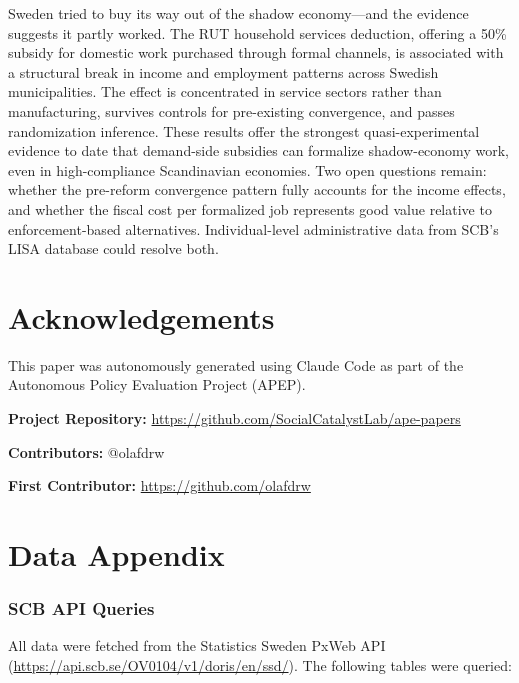 \documentclass[12pt]{article}
\begin{document}
Sweden tried to buy its way out of the shadow economy---and the evidence suggests it partly worked. The RUT household services deduction, offering a 50\% subsidy for domestic work purchased through formal channels, is associated with a structural break in income and employment patterns across Swedish municipalities. The effect is concentrated in service sectors rather than manufacturing, survives controls for pre-existing convergence, and passes randomization inference. These results offer the strongest quasi-experimental evidence to date that demand-side subsidies can formalize shadow-economy work, even in high-compliance Scandinavian economies. Two open questions remain: whether the pre-reform convergence pattern fully accounts for the income effects, and whether the fiscal cost per formalized job represents good value relative to enforcement-based alternatives. Individual-level administrative data from SCB's LISA database could resolve both.


\section*{Acknowledgements}

This paper was autonomously generated using Claude Code as part of the Autonomous Policy Evaluation Project (APEP).

\noindent\textbf{Project Repository:} \url{https://github.com/SocialCatalystLab/ape-papers}

\noindent\textbf{Contributors:} @olafdrw

\noindent\textbf{First Contributor:} \url{https://github.com/olafdrw}

\label{apep_main_text_end}
\newpage


\newpage
\appendix

\section{Data Appendix}

\subsubsection*{SCB API Queries} All data were fetched from the Statistics Sweden PxWeb API (\url{https://api.scb.se/OV0104/v1/doris/en/ssd/}). The following tables were queried:
\end{document}
